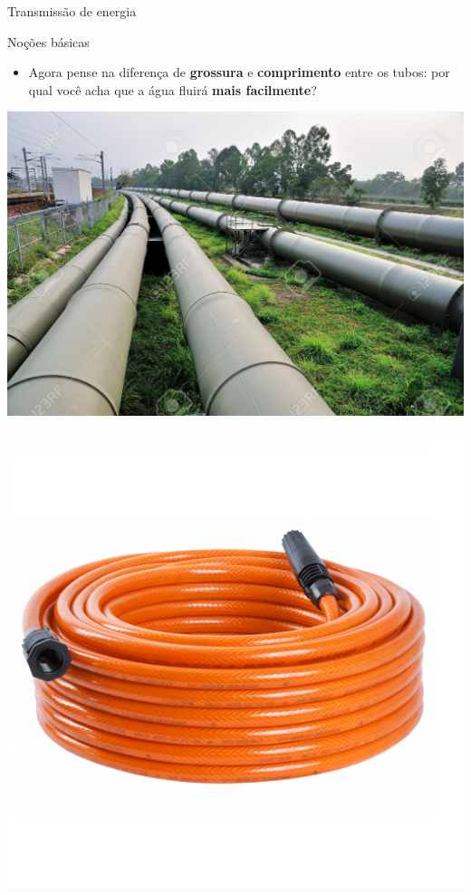 \begin{frame}{Transmissão de energia}
	\begin{block}{Noções básicas}
		\begin{itemize}
			\item Agora pense na diferença de \textbf{grossura} e \textbf{comprimento} entre os tubos: por qual você acha que a água fluirá \textbf{mais facilmente}?
		\end{itemize}
	\end{block}

	\bigskip

	\begin{minipage}{0.49\linewidth}
		\centering
		\includegraphics[width=\linewidth]{Figuras/Ch03/fig6}
	\end{minipage}
	\hfill
	\begin{minipage}{0.49\linewidth}
		\centering
		\includegraphics[width=\linewidth]{Figuras/Ch03/fig7}
	\end{minipage}

\end{frame}


